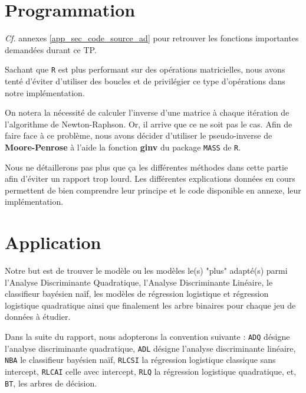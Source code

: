 \documentclass{article}
\begin{document}

\begin{multicols}{2} %

\section{Programmation}
\label{sec_programmation}

\textit{Cf.} annexes \ref{app_sec_code_source_ad} pour retrouver les fonctions importantes demandées durant ce TP.

Sachant que \texttt{R} est plus performant sur des opérations matricielles, nous avons tenté d'éviter d'utiliser des boucles et de privilégier ce type d'opérations dans notre implémentation.

On notera la nécessité de calculer l'inverse d'une matrice à chaque itération de l'algorithme de Newton-Raphson. Or, il arrive que ce ne soit pas le cas. Afin de faire face à ce problème, nous avons décider d'utiliser le pseudo-inverse de \textbf{Moore-Penrose} à l'aide la fonction \textbf{ginv} du package \texttt{MASS} de \texttt{R}.

Nous ne détaillerons pas plus que ça les différentes méthodes dans cette partie afin d'éviter un rapport trop lourd. Les différentes explications données en cours permettent de bien comprendre leur principe et le code disponible en annexe, leur implémentation.

\section{Application}
\label{sec_application}
Notre but est de trouver le modèle ou les modèles le(s) "plus" adapté(s) parmi l’Analyse Discriminante Quadratique, l’Analyse Discriminante Linéaire, le classifieur bayésien naïf, les modèles de régression logistique et régression logistique quadratique ainsi que finalement les arbre binaires pour chaque jeu de données à étudier.

Dans la suite du rapport, nous adopterons la convention suivante : \texttt{ADQ} désigne l'analyse discriminante quadratique, \texttt{ADL} désigne l'analyse discriminante linéaire, \texttt{NBA} le classifieur bayésien naïf, \texttt{RLCSI} la régression logistique classique sans intercept, \texttt{RLCAI} celle avec intercept, \texttt{RLQ} la régression logistique quadratique, et, \texttt{BT}, les arbres de décision.


\end{multicols}
\end{document}
